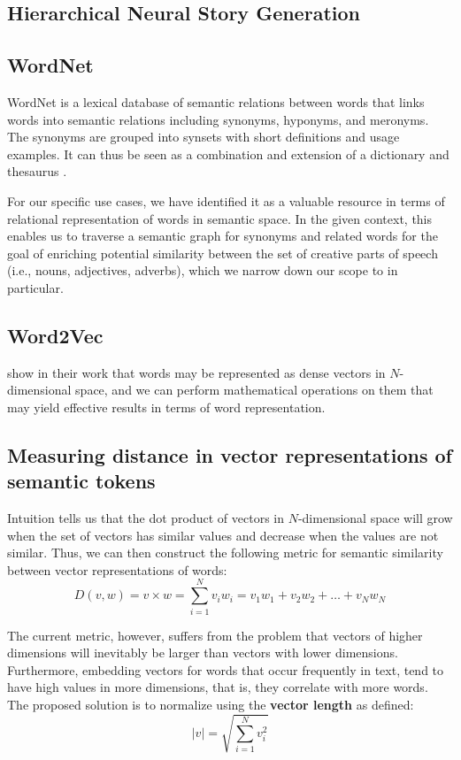 \subsection{Hierarchical Neural Story Generation}
\cite{fan_hierarchical_2018} 
\subsection{WordNet}
WordNet\citep{wordnet1998fellbaum} is a lexical database of semantic relations between words that links words into semantic relations including synonyms, hyponyms, and meronyms. The synonyms are grouped into synsets with short definitions and usage examples. It can thus be seen as a combination and extension of a dictionary and thesaurus \citep{enwiki:1143619785}. 

For our specific use cases, we have identified it as a valuable resource in terms of relational representation of words in semantic space. In the given context, this enables us to traverse a semantic graph for synonyms and related words for the goal of enriching potential similarity between the set of creative parts of speech (i.e., nouns, adjectives, adverbs), which we narrow down our scope to in particular. 
\subsection{Word2Vec}
\citet*{mikolov_word2vec_2013} show in their work that words may be represented as dense vectors in $N$-dimensional space, and we can perform mathematical operations on them that may yield effective results in terms of word representation. 

\subsection*{Measuring distance in vector representations of semantic tokens}
Intuition tells us that the dot product of vectors in $N$-dimensional space will grow when the set of vectors has similar values and decrease when the values are not similar. Thus, we can then construct the following metric for semantic similarity between vector representations of words:
$$ D(v,w) = v \times w = \sum_{i=1}^{N} v_i w_i = v_1 w_1 + v_2 w_2 + \dots + v_N w_N $$ 

The current metric, however, suffers from the problem that vectors of higher dimensions will inevitably be larger than vectors with lower dimensions. Furthermore, embedding vectors for words that occur frequently in text, tend to have high values in more dimensions, that is, they correlate with more words. The proposed solution is to normalize using the \textbf{vector length} as defined:
$$ | v| = \sqrt{\sum_{i=1}^{N}v_i^2}$$

